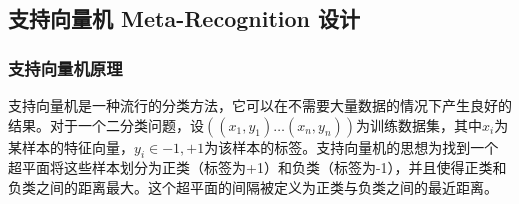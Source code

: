 
\subsection{支持向量机 Meta-Recognition 设计}

\subsubsection{支持向量机原理}
支持向量机是一种流行的分类方法，它可以在不需要大量数据的情况下产生良好的结果。对于一个二分类问题，设$((x_1,y_1)\dots(x_n,y_n))$为训练数据集，其中$x_i$为某样本的特征向量，$y_i\in{-1,+1}$为该样本的标签。支持向量机的思想为找到一个超平面将这些样本划分为正类（标签为+1）和负类（标签为-1），并且使得正类和负类之间的距离最大。这个超平面的间隔被定义为正类与负类之间的最近距离。

